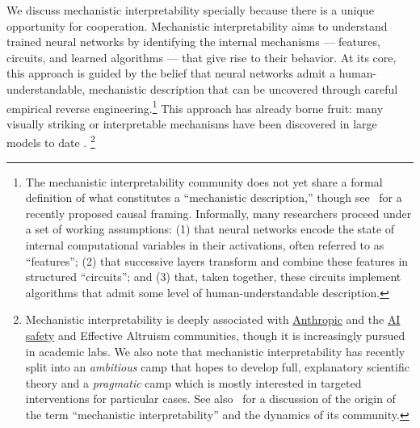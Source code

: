 We discuss mechanistic interpretability specially because there is a unique opportunity for cooperation.
Mechanistic interpretability aims to understand trained neural networks by identifying the internal mechanisms
--- features, circuits, and learned algorithms ---
that give rise to their behavior. %
At its core, this approach is guided by the belief that neural networks admit a  human-understandable, mechanistic description that can be uncovered through careful empirical reverse engineering.\footnote{The mechanistic interpretability community does not yet share a formal definition of what constitutes a ``mechanistic description,'' though see~\citet{geiger2025causal} for a recently proposed causal framing. Informally, many researchers proceed under a set of working assumptions: (1) that neural networks encode the state of internal computational variables in their activations, often referred to as ``features''; (2) that successive layers transform and combine these features in structured ``circuits''; and (3) that, taken together, these circuits implement algorithms that admit some level of human-understandable description.}
This approach has already borne fruit: many visually striking or interpretable mechanisms have been discovered in large models to date \citep{olah2020zoom,templeton2024scaling,engels2024not,gurnee2025when,lindsey2025biology}.%
\footnote{Mechanistic interpretability is deeply associated with \href{https://anthropic.com}{Anthropic} and the \href{https://www.alignmentforum.org/}{AI safety} and Effective Altruism communities, though it is increasingly pursued in academic labs. We also note that mechanistic interpretability has recently split into an \textit{ambitious} camp that hopes to develop full, explanatory scientific theory and a \textit{pragmatic} camp which is mostly interested in targeted interventions for particular cases. See also~\mbox{\cite{saphra2024mechanistic}} for a discussion of the origin of the term ``mechanistic interpretability'' and the dynamics of its community.}

